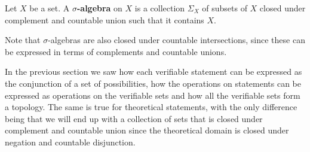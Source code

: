\documentclass[11pt,letterpaper,fleqn]{memoir} %
\begin{document}
\begin{mathSection}
	\begin{defn}
		Let $X$ be a set. A \textbf{$\sigma$-algebra} on $X$ is a collection $\Sigma_X$ of subsets of $X$ closed under complement and countable union such that it contains $X$.
	\end{defn}
\end{mathSection}

Note that $\sigma$-algebras are also closed under countable intersections, since these can be expressed in terms of complements and countable unions.

In the previous section we saw how each verifiable statement can be expressed as the conjunction of a set of possibilities, how the operations on statements can be expressed as operations on the verifiable sets and how all the verifiable sets form a topology. The same is true for theoretical statements, with the only difference being that we will end up with a collection of sets that is closed under complement and countable union since the theoretical domain is closed under negation and countable disjunction.
\end{document}
